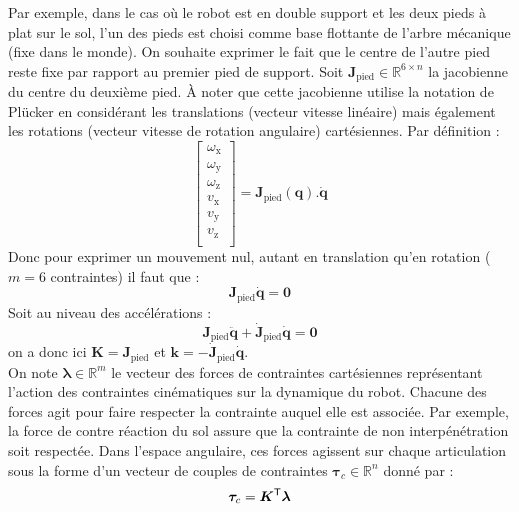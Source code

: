 Par exemple, dans le cas où le robot est en double support et
les deux pieds à plat sur le sol, l'un des pieds est choisi
comme base flottante de l'arbre mécanique (fixe dans le monde).
On souhaite exprimer le fait que le centre de l'autre pied reste fixe 
par rapport au premier pied de support.
Soit $\bm{J}_{\text{pied}} \in \mathbb{R}^{6 \times n}$ la jacobienne 
du centre du deuxième pied.
À noter que cette jacobienne utilise la notation de Plücker en considérant
les translations (vecteur vitesse linéaire) mais également 
les rotations (vecteur vitesse de rotation angulaire) cartésiennes. 
Par définition :
$$
\begin{bmatrix}
    \omega_\text{x} \\
    \omega_\text{y} \\
    \omega_\text{z} \\
    v_\text{x} \\
    v_\text{y} \\
    v_\text{z} \\
\end{bmatrix}
= \bm{J}_{\text{pied}}(\bm{q}) . \bm{\dot{q}}
$$
Donc pour exprimer un mouvement nul, autant en translation qu'en rotation 
($m=6$ contraintes) il faut que : 
$$
\bm{J}_{\text{pied}}\bm{\dot{q}} = \bm{0}
$$
Soit au niveau des accélérations : 
$$
\bm{J}_{\text{pied}}\bm{\ddot{q}} + \bm{\dot{J}}_{\text{pied}}\bm{\dot{q}} = \bm{0}
$$
on a donc ici $\bm{K} = \bm{J}_{\text{pied}}$ et 
$\bm{k} = -\bm{\dot{J}}_{\text{pied}}\bm{\dot{q}}$.\\

On note $\bm{\lambda} \in \mathbb{R}^{m}$ le vecteur des 
\og forces de contraintes \fg cartésiennes représentant l'action 
des contraintes cinématiques sur la dynamique du robot.
Chacune des forces agit pour faire respecter la contrainte
auquel elle est associée.
Par exemple, la force de contre réaction du sol assure que la contrainte
de non interpénétration soit respectée.
Dans l'espace angulaire, ces forces agissent
sur chaque articulation sous la forme d'un vecteur de \og couples de contraintes \fg
$\bm{\tau}_{c} \in \mathbb{R}^{n}$ donné par :
$$
\bm{\tau}_{c} = \bm{K}^{\mathsf{T}} \bm{\lambda}
$$
\newline

